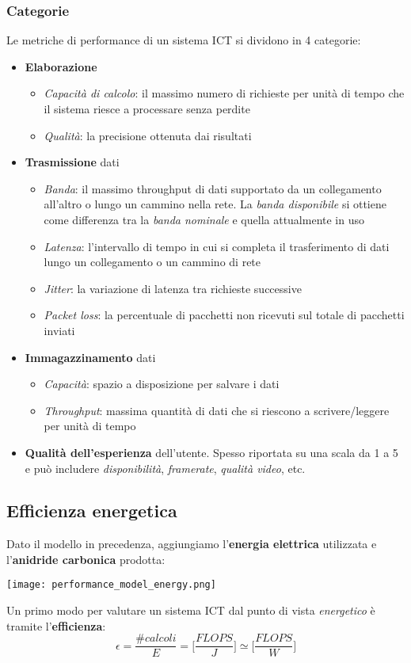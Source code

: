\subsubsection{Categorie}
Le metriche di performance di un sistema ICT si dividono in 4 categorie:
\begin{itemize}
	\item \textbf{Elaborazione} 
	\begin{itemize}
		\item \emph{Capacità di calcolo}: il massimo numero di richieste per unità di tempo che il sistema riesce a processare senza perdite
		\item \emph{Qualità}: la precisione ottenuta dai risultati
	\end{itemize}
	\item \textbf{Trasmissione} dati
	\begin{itemize}
		\item \emph{Banda}: il massimo throughput di dati supportato da un collegamento all'altro o lungo un cammino nella rete. La \emph{banda disponibile} si ottiene come differenza tra la \emph{banda nominale} e quella attualmente in uso
		\item \emph{Latenza}:  l’intervallo di tempo in cui si completa il trasferimento di dati
		lungo un collegamento o un cammino di rete
		\item \emph{Jitter}: la variazione di latenza tra richieste successive
		\item \emph{Packet loss}: la percentuale di pacchetti non ricevuti sul totale di
		pacchetti inviati
	\end{itemize}
	\item \textbf{Immagazzinamento} dati
	\begin{itemize}
		\item \emph{Capacità}: spazio a disposizione per salvare i dati
		\item \emph{Throughput}: massima quantità di dati che si riescono a
		scrivere/leggere per unità di tempo
	\end{itemize}
	\item \textbf{Qualità dell'esperienza} dell'utente. Spesso riportata su una scala da 1 a 5 e può includere \emph{disponibilità}, \emph{framerate}, \emph{qualità video}, etc.
\end{itemize}
\subsection{Efficienza energetica}
Dato il modello in precedenza, aggiungiamo l'\textbf{energia elettrica} utilizzata e l'\textbf{anidride carbonica} prodotta:
\begin{center}
	\texttt{[image: performance\_model\_energy.png]}
\end{center}
Un primo modo per valutare un sistema ICT dal punto di vista \emph{energetico} è tramite l'\textbf{efficienza}:
\begin{equation}
	\epsilon = \frac{\#calcoli}{E}=\bigg[\frac{FLOPS}{J}\bigg] \simeq \bigg[\frac{FLOPS}{W}\bigg]
\end{equation}

